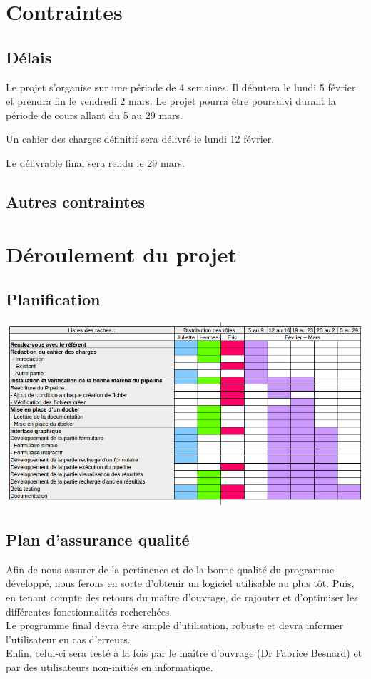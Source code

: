 \documentclass[12pt]{article}
\begin{document}
\section{Contraintes}
\subsection{Délais}

Le projet s'organise sur une période de 4 semaines. Il débutera le lundi 5 février et prendra fin le vendredi 2 mars. Le projet pourra être poursuivi durant la période de cours allant du 5 au 29 mars.

Un cahier des charges définitif sera délivré le lundi 12 février.

Le délivrable final sera rendu le 29 mars.

\subsection{Autres contraintes}
\section{Déroulement du projet}
\subsection{Planification}

\includegraphics[scale=0.6]{gantt.png}

\subsection{Plan d'assurance qualité}

Afin de nous assurer de la pertinence et de la bonne qualité du programme développé, nous ferons en sorte d'obtenir un logiciel utilisable au plus tôt. Puis, en tenant compte des retours du maître d'ouvrage, de rajouter et d'optimiser les différentes fonctionnalités recherchées.\\
Le programme final devra être simple d'utilisation, robuste et devra informer l'utilisateur en cas d'erreurs.\\
Enfin, celui-ci sera testé à la fois par le maître d'ouvrage (Dr Fabrice Besnard) et par des utilisateurs non-initiés en informatique.
\end{document}
